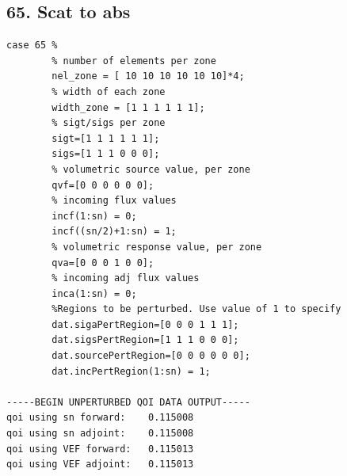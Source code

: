 \documentclass{article}
\begin{document}
\subsection{65. Scat to abs}
\begin{verbatim}
case 65 %
        % number of elements per zone
        nel_zone = [ 10 10 10 10 10 10]*4;
        % width of each zone
        width_zone = [1 1 1 1 1 1];
        % sigt/sigs per zone
        sigt=[1 1 1 1 1 1];
        sigs=[1 1 1 0 0 0];
        % volumetric source value, per zone
        qvf=[0 0 0 0 0 0];
        % incoming flux values
        incf(1:sn) = 0;
        incf((sn/2)+1:sn) = 1;
        % volumetric response value, per zone
        qva=[0 0 0 1 0 0];
        % incoming adj flux values
        inca(1:sn) = 0;
        %Regions to be perturbed. Use value of 1 to specify
        dat.sigaPertRegion=[0 0 0 1 1 1];
        dat.sigsPertRegion=[1 1 1 0 0 0];
        dat.sourcePertRegion=[0 0 0 0 0 0];
        dat.incPertRegion(1:sn) = 1; 
        
-----BEGIN UNPERTURBED QOI DATA OUTPUT----- 
qoi using sn forward: 	 0.115008 
qoi using sn adjoint: 	 0.115008 
qoi using VEF forward: 	 0.115013 
qoi using VEF adjoint: 	 0.115013 
\end{verbatim}
\end{document}
